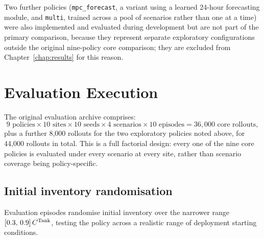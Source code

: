 Two further policies (\texttt{mpc\_forecast}, a variant using a learned
24-hour forecasting module, and \texttt{multi}, trained across a pool of
scenarios rather than one at a time) were also implemented and
evaluated during development but are not part of the primary comparison,
because they represent separate exploratory configurations outside
the original nine-policy core comparison; they are excluded from
Chapter~\ref{chap:results} for this reason.



\section{Evaluation Execution}
\label{sec:eval_execution}

The original evaluation archive comprises:
\[
9 \text{ policies} \times 10 \text{ sites} \times 10 \text{ seeds}
\times 4 \text{ scenarios} \times 10 \text{ episodes} =
36{,}000 \text{ core rollouts},
\]
plus a further 8{,}000 rollouts for the two exploratory policies noted
above, for 44{,}000 rollouts in total. This is a full factorial design:
every one of the nine core policies is evaluated under every scenario at
every site, rather than scenario coverage being policy-specific.

\subsection{Initial inventory randomisation}

 Evaluation episodes
randomise initial inventory over the narrower range
$[0.3,\,0.9]\,C^{\mathrm{Tank}}$, testing the policy across a realistic range of
deployment starting conditions.


